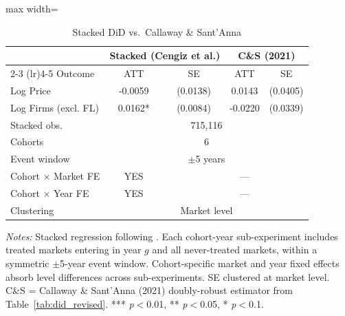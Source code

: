 \begin{table}[htbp]
\centering
\caption{Stacked DiD vs.\ Callaway \& Sant'Anna}
\label{tab:stacked_did}
\begin{adjustbox}{max width=\textwidth}
\begin{threeparttable}
\small
\begin{tabular}{lcccc}
\toprule
 & \multicolumn{2}{c}{Stacked (Cengiz et al.)} & \multicolumn{2}{c}{C\&S (2021)} \\
\cmidrule(lr){2-3} \cmidrule(lr){4-5}
Outcome & ATT & SE & ATT & SE \\
\midrule
Log Price & -0.0059 & (0.0138) & 0.0143 & (0.0405) \\
Log Firms (excl. FL) & 0.0162* & (0.0084) & -0.0220 & (0.0339) \\
\midrule
Stacked obs. & \multicolumn{4}{c}{715,116} \\
Cohorts & \multicolumn{4}{c}{6} \\
Event window & \multicolumn{4}{c}{$\pm$5 years} \\
Cohort $\times$ Market FE & YES & & --- & \\
Cohort $\times$ Year FE & YES & & --- & \\
Clustering & \multicolumn{4}{c}{Market level} \\
\bottomrule
\end{tabular}
\begin{tablenotes}
\small
\item \textit{Notes:} Stacked regression following \citet{cengiz2019effect}.
Each cohort-year sub-experiment includes treated markets entering in year $g$
and all never-treated markets, within a symmetric $\pm$5-year event window.
Cohort-specific market and year fixed effects absorb level differences across
sub-experiments. SE clustered at market level.
C\&S = Callaway \& Sant'Anna (2021) doubly-robust estimator from Table~\ref{tab:did_revised}.
*** \textit{p}$<$0.01, ** \textit{p}$<$0.05, * \textit{p}$<$0.1.
\end{tablenotes}
\end{threeparttable}
\end{adjustbox}
\end{table}
